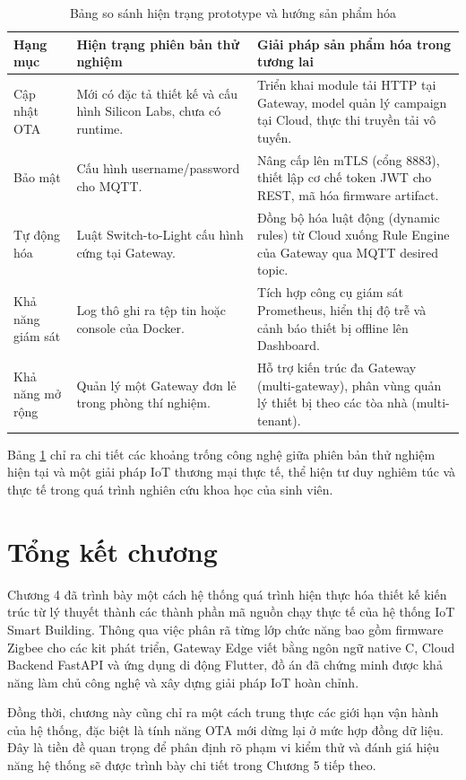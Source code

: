 \begin{table}[H]
\centering
\caption{Bảng so sánh hiện trạng prototype và hướng sản phẩm hóa}
\label{tab:ch4-product-boundary}
\footnotesize
\begin{tabular}{|p{2.6cm}|p{5.5cm}|p{6.4cm}|}
\hline
\textbf{Hạng mục} & \textbf{Hiện trạng phiên bản thử nghiệm} & \textbf{Giải pháp sản phẩm hóa trong tương lai} \\ \hline
Cập nhật OTA & Mới có đặc tả thiết kế và cấu hình Silicon Labs, chưa có runtime. & Triển khai module tải HTTP tại Gateway, model quản lý campaign tại Cloud, thực thi truyền tải vô tuyến. \\ \hline
Bảo mật & Cấu hình username/password cho MQTT. & Nâng cấp lên mTLS (cổng 8883), thiết lập cơ chế token JWT cho REST, mã hóa firmware artifact. \\ \hline
Tự động hóa & Luật Switch-to-Light cấu hình cứng tại Gateway. & Đồng bộ hóa luật động (dynamic rules) từ Cloud xuống Rule Engine của Gateway qua MQTT desired topic. \\ \hline
Khả năng giám sát & Log thô ghi ra tệp tin hoặc console của Docker. & Tích hợp công cụ giám sát Prometheus, hiển thị độ trễ và cảnh báo thiết bị offline lên Dashboard. \\ \hline
Khả năng mở rộng & Quản lý một Gateway đơn lẻ trong phòng thí nghiệm. & Hỗ trợ kiến trúc đa Gateway (multi-gateway), phân vùng quản lý thiết bị theo các tòa nhà (multi-tenant). \\ \hline
\end{tabular}
\end{table}

Bảng \ref{tab:ch4-product-boundary} chỉ ra chi tiết các khoảng trống công nghệ giữa phiên bản thử nghiệm hiện tại và một giải pháp IoT thương mại thực tế, thể hiện tư duy nghiêm túc và thực tế trong quá trình nghiên cứu khoa học của sinh viên.

\section{Tổng kết chương}
\label{sec:ch4-summary}

Chương 4 đã trình bày một cách hệ thống quá trình hiện thực hóa thiết kế kiến trúc từ lý thuyết thành các thành phần mã nguồn chạy thực tế của hệ thống IoT Smart Building. Thông qua việc phân rã từng lớp chức năng bao gồm firmware Zigbee cho các kit phát triển, Gateway Edge viết bằng ngôn ngữ native C, Cloud Backend FastAPI và ứng dụng di động Flutter, đồ án đã chứng minh được khả năng làm chủ công nghệ và xây dựng giải pháp IoT hoàn chỉnh. 

Đồng thời, chương này cũng chỉ ra một cách trung thực các giới hạn vận hành của hệ thống, đặc biệt là tính năng OTA mới dừng lại ở mức hợp đồng dữ liệu. Đây là tiền đề quan trọng để phân định rõ phạm vi kiểm thử và đánh giá hiệu năng hệ thống sẽ được trình bày chi tiết trong Chương 5 tiếp theo.
